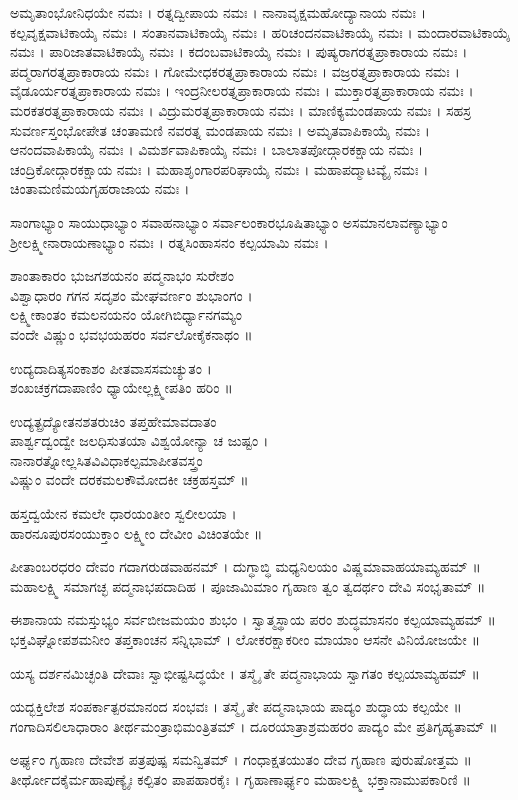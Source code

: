 ಅಮೃತಾಂಭೋನಿಧಯೇ ನಮಃ । ರತ್ನದ್ವೀಪಾಯ ನಮಃ । ನಾನಾವೃಕ್ಷಮಹೋದ್ಯಾನಾಯ ನಮಃ । ಕಲ್ಪವೃಕ್ಷವಾಟಿಕಾಯೈ ನಮಃ । ಸಂತಾನವಾಟಿಕಾಯೈ ನಮಃ । ಹರಿಚಂದನವಾಟಿಕಾಯೈ ನಮಃ । ಮಂದಾರವಾಟಿಕಾಯೈ ನಮಃ । ಪಾರಿಜಾತವಾಟಿಕಾಯೈ ನಮಃ । ಕದಂಬವಾಟಿಕಾಯೈ ನಮಃ । ಪುಷ್ಯರಾಗರತ್ನಪ್ರಾಕಾರಾಯ ನಮಃ । ಪದ್ಮರಾಗರತ್ನಪ್ರಾಕಾರಾಯ ನಮಃ । ಗೋಮೇಧಕರತ್ನಪ್ರಾಕಾರಾಯ ನಮಃ । ವಜ್ರರತ್ನಪ್ರಾಕಾರಾಯ ನಮಃ । ವೈಡೂರ್ಯರತ್ನಪ್ರಾಕಾರಾಯ ನಮಃ । ಇಂದ್ರನೀಲರತ್ನಪ್ರಾಕಾರಾಯ ನಮಃ । ಮುಕ್ತಾರತ್ನಪ್ರಾಕಾರಾಯ ನಮಃ । ಮರಕತರತ್ನಪ್ರಾಕಾರಾಯ ನಮಃ । ವಿದ್ರುಮರತ್ನಪ್ರಾಕಾರಾಯ ನಮಃ । ಮಾಣಿಕ್ಯಮಂಡಪಾಯ ನಮಃ । ಸಹಸ್ರ ಸುವರ್ಣಸ್ತಂಭೋಪೇತ ಚಂತಾಮಣಿ ನವರತ್ನ ಮಂಡಪಾಯ ನಮಃ । ಅಮೃತವಾಪಿಕಾಯೈ ನಮಃ । ಆನಂದವಾಪಿಕಾಯೈ ನಮಃ । ವಿಮರ್ಶವಾಪಿಕಾಯೈ ನಮಃ । ಬಾಲಾತಪೋದ್ಗಾರಕಕ್ಷಾಯ ನಮಃ । ಚಂದ್ರಿಕೋದ್ಗಾರಕಕ್ಷಾಯ ನಮಃ । ಮಹಾಶೃಂಗಾರಪರಿಘಾಯೈ ನಮಃ । ಮಹಾಪದ್ಮಾಟವ್ಯೈ ನಮಃ । ಚಿಂತಾಮಣಿಮಯಗೃಹರಾಜಾಯ ನಮಃ ।

ಸಾಂಗಾಭ್ಯಾಂ ಸಾಯುಧಾಭ್ಯಾಂ ಸವಾಹನಾಭ್ಯಾಂ ಸರ್ವಾಲಂಕಾರಭೂಷಿತಾಭ್ಯಾಂ  ಅಸಮಾನಲಾವಣ್ಯಾಭ್ಯಾಂ ಶ್ರೀಲಕ್ಷ್ಮೀನಾರಾಯಣಾಭ್ಯಾಂ ನಮಃ । ರತ್ನಸಿಂಹಾಸನಂ ಕಲ್ಪಯಾಮಿ ನಮಃ । 

ಶಾಂತಾಕಾರಂ ಭುಜಗಶಯನಂ ಪದ್ಮನಾಭಂ ಸುರೇಶಂ\\
ವಿಶ್ವಾಧಾರಂ ಗಗನ ಸದೃಶಂ ಮೇಘವರ್ಣಂ ಶುಭಾಂಗಂ ।\\
ಲಕ್ಷ್ಮೀಕಾಂತಂ ಕಮಲನಯನಂ ಯೋಗಿಬಿರ್ಧ್ಯಾನಗಮ್ಯಂ\\
ವಂದೇ ವಿಷ್ಣುಂ ಭವಭಯಹರಂ ಸರ್ವಲೋಕೈಕನಾಥಂ ॥

ಉದ್ಯದಾದಿತ್ಯಸಂಕಾಶಂ ಪೀತವಾಸಸಮಚ್ಯುತಂ ।\\
ಶಂಖಚಕ್ರಗದಾಪಾಣಿಂ ಧ್ಯಾಯೇಲ್ಲಕ್ಷ್ಮೀಪತಿಂ ಹರಿಂ ॥

ಉದ್ಯತ್ಪ್ರದ್ಯೋತನಶತರುಚಿಂ ತಪ್ತಹೇಮಾವದಾತಂ\\
ಪಾರ್ಶ್ವದ್ವಂದ್ವೇ ಜಲಧಿಸುತಯಾ ವಿಶ್ವಯೋನ್ಯಾ ಚ ಜುಷ್ಟಂ ।\\
ನಾನಾರತ್ನೋಲ್ಲಸಿತವಿವಿಧಾಕಲ್ಪಮಾಪೀತವಸ್ತ್ರಂ\\
ವಿಷ್ಣುಂ ವಂದೇ ದರಕಮಲಕೌಮೋದಕೀ ಚಕ್ರಹಸ್ತಮ್ ॥

ಹಸ್ತದ್ವಯೇನ ಕಮಲೇ ಧಾರಯಂತೀಂ ಸ್ವಲೀಲಯಾ ।\\
ಹಾರನೂಪುರಸಂಯುಕ್ತಾಂ ಲಕ್ಷ್ಮೀಂ ದೇವೀಂ ವಿಚಿಂತಯೇ ॥

ಪೀತಾಂಬರಧರಂ ದೇವಂ ಗದಾಗರುಡವಾಹನಮ್ । ದುಗ್ಧಾಬ್ಧಿ ಮಧ್ಯನಿಲಯಂ ವಿಷ್ಣಮಾವಾಹಯಾಮ್ಯಹಮ್ ॥
ಮಹಾಲಕ್ಷ್ಮಿ ಸಮಾಗಚ್ಛ ಪದ್ಮನಾಭಪದಾದಿಹ । ಪೂಜಾಮಿಮಾಂ ಗೃಹಾಣ ತ್ವಂ ತ್ವದರ್ಥಂ ದೇವಿ ಸಂಭೃತಾಮ್ ॥

ಈಶಾನಾಯ ನಮಸ್ತುಭ್ಯಂ ಸರ್ವಬೀಜಮಯಂ ಶುಭಂ । ಸ್ವಾತ್ಮಸ್ಥಾಯ ಪರಂ ಶುದ್ಧಮಾಸನಂ ಕಲ್ಪಯಾಮ್ಯಹಮ್ ॥
ಭಕ್ತವಿಘ್ನೋಪಶಮನೀಂ ತಪ್ತಕಾಂಚನ ಸನ್ನಿಭಾಮ್ । ಲೋಕರಕ್ಷಾಕರೀಂ ಮಾಯಾಂ ಆಸನೇ ವಿನಿಯೋಜಯೇ ॥

ಯಸ್ಯ ದರ್ಶನಮಿಚ್ಛಂತಿ ದೇವಾಃ ಸ್ವಾಭೀಷ್ಟಸಿದ್ಧಯೇ । ತಸ್ಮೈ ತೇ ಪದ್ಮನಾಭಾಯ ಸ್ವಾಗತಂ ಕಲ್ಪಯಾಮ್ಯಹಮ್ ॥

ಯದ್ಭಕ್ತಿಲೇಶ ಸಂಪರ್ಕಾತ್ಪರಮಾನಂದ ಸಂಭವಃ । ತಸ್ಮೈ ತೇ ಪದ್ಮನಾಭಾಯ ಪಾದ್ಯಂ ಶುದ್ಧಾಯ ಕಲ್ಪಯೇ ॥
ಗಂಗಾದಿಸಲಿಲಾಧಾರಾಂ ತೀರ್ಥಮಂತ್ರಾಭಿಮಂತ್ರಿತಮ್ । ದೂರಯಾತ್ರಾಶ್ರಮಹರಂ ಪಾದ್ಯಂ ಮೇ ಪ್ರತಿಗೃಹ್ಯತಾಮ್ ॥

ಅರ್ಘ್ಯಂ ಗೃಹಾಣ ದೇವೇಶ ಪತ್ರಪುಷ್ಪ ಸಮನ್ವಿತಮ್ । ಗಂಧಾಕ್ಷತಯುತಂ ದೇವ ಗೃಹಾಣ ಪುರುಷೋತ್ತಮ ॥
ತೀರ್ಥೋದಕೈರ್ಮಹಾಪುಣ್ಯೈಃ ಕಲ್ಪಿತಂ ಪಾಪಹಾರಕೈಃ । ಗೃಹಾಣಾರ್ಘ್ಯಂ ಮಹಾಲಕ್ಷ್ಮಿ ಭಕ್ತಾನಾಮುಪಕಾರಿಣಿ ॥

